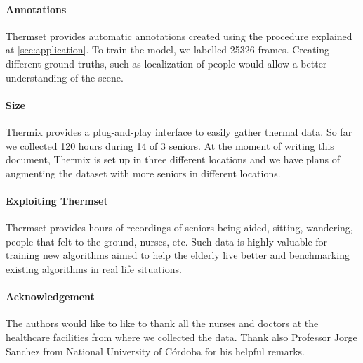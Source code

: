 \documentclass[oneside, twocolumn]{article}
\newcommand\TotalHoursOfRecording{120}
\newcommand\TotalNumbersOfDays{14}
\newcommand\NumberOfPeople{3}
\begin{document}
\paragraph{Annotations}
Thermset provides automatic annotations created using the procedure explained at \autoref{sec:application}.
To train the model, we labelled 25326 frames. Creating different ground truths, such as localization of
people would allow a better understanding of the scene.
\paragraph{Size}
Thermix provides a plug-and-play interface to easily gather thermal data. So far we collected \TotalHoursOfRecording{}
hours during \TotalNumbersOfDays{} of \NumberOfPeople{} seniors. At the moment of writing this document, Thermix is set up in
three different locations and we have plans of augmenting the dataset with more seniors in different locations.

\paragraph{Exploiting Thermset}
Thermset provides hours of recordings of seniors being aided, sitting, wandering, people that felt to the
ground, nurses, etc. Such data is highly valuable for training new algorithms aimed to help the elderly live
better and benchmarking existing algorithms in real life situations.
\paragraph{Acknowledgement}
The authors would like to like to thank all the nurses and doctors at the healthcare facilities from where we
collected the data. Thank also Professor Jorge Sanchez from National University of C\'ordoba for his helpful remarks.

\end{document}
